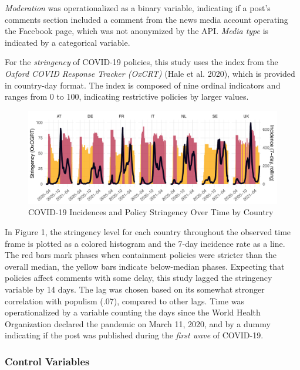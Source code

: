 \documentclass[
]{ccr}
\begin{document}
\emph{Moderation} was operationalized as a binary variable, indicating
if a post's comments section included a comment from the news media
account operating the Facebook page, which was not anonymized by the
API. \emph{Media type} is indicated by a categorical variable.

For the \emph{stringency} of COVID-19 policies, this study uses the
index from the \emph{Oxford COVID Response Tracker (OxCRT)} (Hale et al.
2020), which is provided in country-day format. The index is composed of
nine ordinal indicators and ranges from 0 to 100, indicating restrictive
policies by larger values.

\begin{figure}

{\centering \includegraphics{plots/p_realw_20240226.pdf}

}

\caption{COVID-19 Incidences and Policy Stringency Over Time by Country}

\end{figure}

In Figure 1, the stringency level for each country throughout the
observed time frame is plotted as a colored histogram and the 7-day
incidence rate as a line. The red bars mark phases when containment
policies were stricter than the overall median, the yellow bars indicate
below-median phases. Expecting that policies affect comments with some
delay, this study lagged the stringency variable by 14 days. The lag was
chosen based on its somewhat stronger correlation with populism (.07),
compared to other lags. Time was operationalized by a variable counting
the days since the World Health Organization declared the pandemic on
March 11, 2020, and by a dummy indicating if the post was published
during the \emph{first wave} of COVID-19.

\hypertarget{control-variables}{%
\subsubsection{Control Variables}\label{control-variables}}
\end{document}
